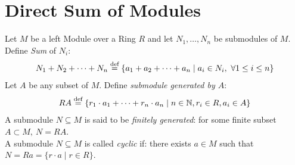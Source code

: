 \section{Direct Sum of Modules}
\begin{definition}
    Let $M$ be a left Module over a Ring $R$ and let $N_1, \ldots, N_n$ be submodules of $M$. \\
    Define \textit{Sum} of $N_i$:
    \begin{align*}
        N_1 + N_2 + \cdots + N_n \overset{\textnormal{def}}{=} \{a_1 + a_2 + \cdots + a_n \mid a_i \in N_i,\ \forall 1 \leq i \leq n \}
    \end{align*}
    Let $A$ be any subset of $M$. Define \textit{submodule generated by $A$}:
    \begin{align*}
        RA \overset{\textnormal{def}}{=} \{r_1 \cdot a_1 + \cdots + r_n \cdot a_n \mid n \in \mathbb{N}, r_i \in R, a_i \in A\}
    \end{align*}
    A submodule $N \subseteq M$ is said to be \textit{finitely generated}: for some finite subset $A \subset M,\ N = RA$. \\
    A submodule $N \subseteq M$ is called \textit{cyclic} if: there exists $a \in M$ such that $N = R a = \{r \cdot a \mid r \in R\}$.
\end{definition}

